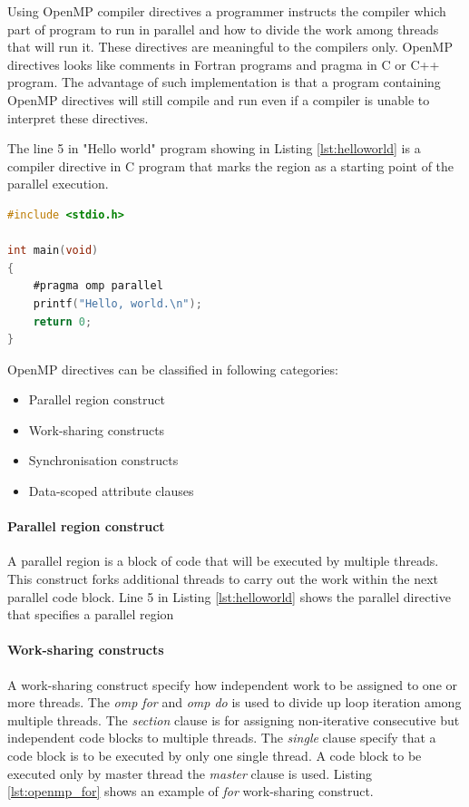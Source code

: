 Using OpenMP compiler directives a programmer instructs the compiler which part of program to run in parallel and how to divide the work among threads that  will run it. These directives are meaningful to the compilers only. OpenMP directives looks like comments in Fortran programs and pragma in C or C++ program. The advantage of such implementation is that a program containing OpenMP directives will still compile and run even if a compiler is unable to interpret these directives.

The line 5 in "Hello world" program showing in Listing \ref{lst:helloworld} is a compiler directive in C program that marks the region as a starting point of the parallel execution.

\begin{lstlisting}[language=C, caption={A "Hello world" program in C using OpenMP compiler directive}, label={lst:helloworld}]
#include <stdio.h>

int main(void)
{
    #pragma omp parallel
    printf("Hello, world.\n");
    return 0;
}
\end{lstlisting}

OpenMP directives can be classified in following categories:
\begin{itemize}
	\item Parallel region construct
	\item Work-sharing constructs
	\item Synchronisation constructs
	\item Data-scoped attribute clauses
\end{itemize}

\paragraph{Parallel region construct} A parallel region is a block of code that will be executed by multiple threads. This construct forks additional threads to carry out the work within the next parallel code block. Line 5 in Listing \ref{lst:helloworld} shows the parallel directive that specifies a parallel region \citep{Barney:16-openmp}

\paragraph{Work-sharing constructs}
A work-sharing construct specify how independent work to be assigned to one or more threads. The \emph{omp for} and \emph{omp do} is used to divide up loop iteration among multiple threads. The \emph{section} clause is for assigning non-iterative consecutive but independent code blocks to multiple threads. The \emph{single} clause specify that a code block is to be executed by only one single thread. A code block to be executed only by master thread the \emph{master} clause is used. Listing \ref{lst:openmp_for} shows an example of \emph{for} work-sharing construct. \citep{Barney:16-openmp}

